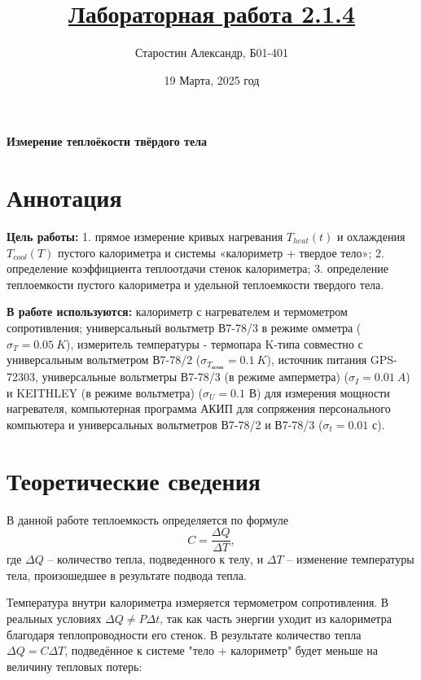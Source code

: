 \documentclass[a4paper]{article}
\title{\underline{Лабораторная работа 2.1.4}}
\author{Старостин Александр, Б01-401}
\date {19 Марта, 2025 год}
\begin{document}
\maketitle
\newpage

\textbf{Измерение теплоёкости твёрдого тела}

\section{Аннотация}
    \par \textbf{Цель работы:} 1. прямое измерение кривых нагревания $T_{heat}(t)$ и охлаждения $T_{cool}(T)$ пустого калориметра и системы «калориметр + твердое тело»; 2. определение коэффициента теплоотдачи стенок калориметра; 3. определение теплоемкости пустого калориметра и удельной теплоемкости твердого тела. \\

    \par \textbf{В работе используются:} калориметр с нагревателем и термометром сопротивления; универсальный вольтметр В7-78/3 в режиме омметра ($\sigma_{T} = 0.05~K$), измеритель температуры - термопара K-типа совместно с универсальным вольтметром В7-78/2 ($\sigma_{T_\text {комн}} = 0.1~K$), источник питания GPS-72303, универсальные вольтметры В7-78/3 (в режиме амперметра) ($\sigma_I = 0.01~A$) и KEITHLEY (в режиме вольтметра) ($\sigma_U = 0.1 \text{ В}$) для измерения мощности нагревателя, компьютерная программа АКИП для сопряжения персонального компьютера и универсальных вольтметров В7-78/2 и В7-78/3 ($\sigma_t = 0.01 \text{ с}$).

\section{Теоретические сведения}

          В данной работе теплоемкость определяется по формуле
        \begin{equation}
            C = \frac{\Delta Q}{\Delta T},
            \label{eq:dQdT}
        \end{equation}
        где $\Delta Q$ -- количество тепла, подведенного к телу, и $\Delta T$ -- изменение температуры тела, произошедшее в результате подвода тепла.

        Температура внутри калориметра измеряется термометром сопротивления. В реальных условиях $\Delta Q \neq P \Delta t$, так как часть энергии уходит из калориметра благодаря теплопроводности его стенок. В результате количество тепла $\Delta Q = C \Delta T$, подведённое к системе "тело + калориметр" будет меньше на величину тепловых потерь:
\end{document}
